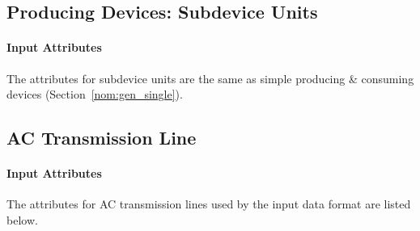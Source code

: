 \documentclass{article}
\begin{document}
\subsection{Producing Devices: Subdevice Units}
\label{nom:gen_sub}
\paragraph{Input Attributes}
The attributes for subdevice units are the same 
as simple producing \& consuming devices (Section~\ref{nom:gen_single}).

\subsection{AC Transmission Line}
\label{nom:line}
\paragraph{Input Attributes}
The attributes for AC transmission lines used by the input data format are listed below.
\end{document}
